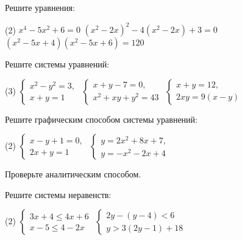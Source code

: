 \begin{exam}
	\begin{listofex}
		\item Решите уравнения:
		\begin{tasks}(2)
			\task \( x^4-5x^2+6=0 \)
			\task \( (x^2-2x)^2-4(x^2-2x)+3=0 \)
			\task \( (x^2-5x+4)(x^2-5x+6)=120 \)
		\end{tasks}
		\item Решите системы уравнений:
		\begin{tasks}(3)
			\task \( \begin{cases} x^2-y^2=3,\\ x+y=1 \end{cases} \)
			\task \( \begin{cases} x+y-7=0,\\ x^2+xy+y^2=43 \end{cases} \)
			\task \( \begin{cases} x+y=12,\\ 2xy=9(x-y) \end{cases} \)
		\end{tasks}
		\item Решите графическим способом системы уравнений:
		\begin{tasks}(2)
			\task \( \begin{cases} x-y+1=0,\\ 2x+y=1 \end{cases} \)
			\task \( \begin{cases} y=2x^2+8x+7,\\ y=-x^2-2x+4 \end{cases} \)
		\end{tasks}
		Проверьте аналитическим способом.
		\item Решите системы неравенств:
		\begin{tasks}(2)
			\task \( \begin{cases} 3x+4 \le 4x+6 \\ x-5 \le 4-2x \end{cases} \)
			\task \( \begin{cases} 2y-(y-4)<6 \\ y>3(2y-1)+18 \end{cases} \)
		\end{tasks}
	\end{listofex}
\end{exam}

